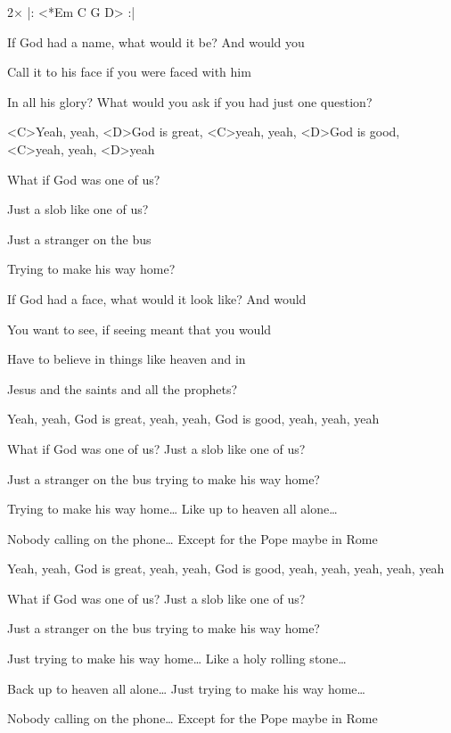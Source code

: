

2× |: <*Em C G D> :|

\zs
If God had a name, what would it be? And would you

Call it to his face if you were faced with him

In all his glory? What would you ask if you had just one question?

<C>Yeah, yeah, <D>God is great, <C>yeah, yeah, <D>God is good, <C>yeah, yeah, <D>yeah
\ks

\zr
What if God was one of us?

Just a slob like one of us?

Just a stranger on the bus

Trying to make his way home?
\kr

\zs
If God had a face, what would it look like? And would

You want to see, if seeing meant that you would

Have to believe in things like heaven and in 

Jesus and the saints and all the prophets?

Yeah, yeah, God is great, yeah, yeah, God is good, yeah, yeah, yeah
\ks

\zr
What if God was one of us?  Just a slob like one of us?

Just a stranger on the bus trying to make his way home?

Trying to make his way home…  Like up to heaven all alone…

Nobody calling on the phone…  Except for the Pope maybe in Rome

Yeah, yeah, God is great, yeah, yeah, God is good, yeah, yeah, yeah, yeah, yeah
\kr

\zr
What if God was one of us?  Just a slob like one of us?

Just a stranger on the bus trying to make his way home?

Just trying to make his way home…
Like a holy rolling stone…

Back up to heaven all alone…
Just trying to make his way home…

Nobody calling on the phone…
Except for the Pope maybe in Rome
\kr

\kp
